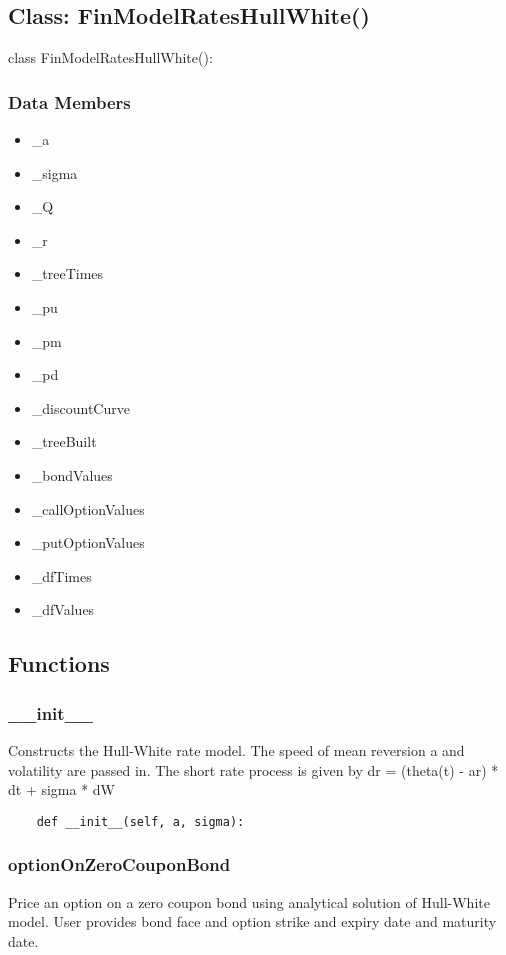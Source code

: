 \documentclass[twoside,11pt]{book}
\begin{document}
\subsection*{Class: FinModelRatesHullWhite()}
class FinModelRatesHullWhite(): 

\subsubsection*{Data Members}
\begin{itemize}
\item{\_a}
\item{\_sigma}
\item{\_Q}
\item{\_r}
\item{\_treeTimes}
\item{\_pu}
\item{\_pm}
\item{\_pd}
\item{\_discountCurve}
\item{\_treeBuilt}
\item{\_bondValues}
\item{\_callOptionValues}
\item{\_putOptionValues}
\item{\_dfTimes}
\item{\_dfValues}
\end{itemize}

\subsection*{Functions}

\subsubsection*{{\bf \_\_init\_\_}}
Constructs the Hull-White rate model. The speed of mean reversion a and volatility are passed in. The short rate process is given by dr = (theta(t) - ar) * dt  + sigma * dW  

\begin{lstlisting}
    def __init__(self, a, sigma):
\end{lstlisting}

\subsubsection*{{\bf optionOnZeroCouponBond}}
Price an option on a zero coupon bond using analytical solution of Hull-White model. User provides bond face and option strike and expiry date and maturity date.  
\end{document}
